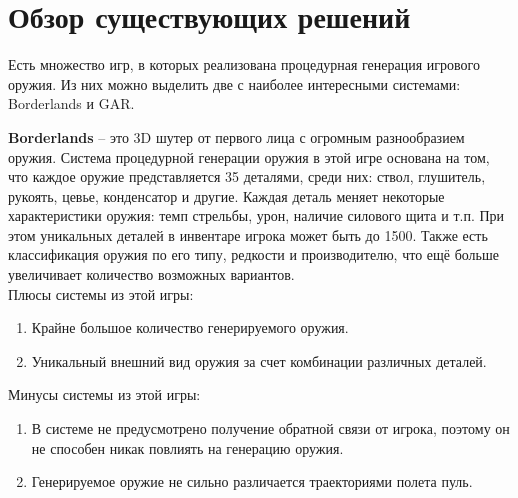 ﻿%
\section{Обзор существующих решений}\label{sec:existingSolutions}

Есть множество игр, в которых реализована процедурная генерация игрового оружия. Из них можно выделить две с наиболее интересными системами: Borderlands\cite{s14} и GAR\cite{s15}.

\vspace{3mm}

\textbf{Borderlands} -- это 3D шутер от первого лица с огромным разнообразием оружия. Система процедурной генерации оружия в этой игре основана на том, что каждое оружие представляется 35 деталями, среди них: ствол, глушитель, рукоять, цевье, конденсатор и другие. Каждая деталь меняет некоторые характеристики оружия: темп стрельбы, урон, наличие силового щита и т.п. При этом уникальных деталей в инвентаре игрока может быть до 1500. Также есть классификация оружия по его типу, редкости и производителю, что ещё больше увеличивает количество возможных вариантов. 
%
\\Плюсы системы из этой игры:
\begin{enumerate}[--]
    \item Крайне большое количество генерируемого оружия.
    \item Уникальный внешний вид оружия за счет комбинации различных деталей.
\end{enumerate} 
%
Минусы системы из этой игры:
\begin{enumerate}[--]
    \item В системе не предусмотрено получение обратной связи от игрока, поэтому он не способен никак повлиять на генерацию оружия.
    \item Генерируемое оружие не сильно различается траекториями полета пуль.
\end{enumerate}

\vspace{3mm}

